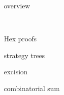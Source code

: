 \noindent
overview

\ 

\bitz
\item Hex proofs 
\item strategy trees
\item excision
\item combinatorial sum
\eitz
